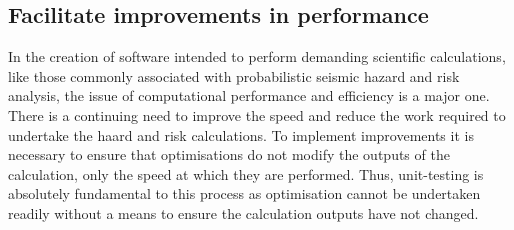\subsection{Facilitate improvements in performance}
In the creation of software intended to perform demanding scientific calculations, like those commonly associated with probabilistic seismic hazard and risk analysis, the issue of computational performance and efficiency is a major one. There is a continuing need to improve the speed and reduce the work required to undertake the haard and risk calculations. To implement improvements it is necessary to ensure that optimisations do not modify the outputs of the calculation, only the speed at which they are performed. Thus, unit-testing is absolutely fundamental to this process as optimisation cannot be undertaken readily without a means to ensure the calculation outputs have not changed.
